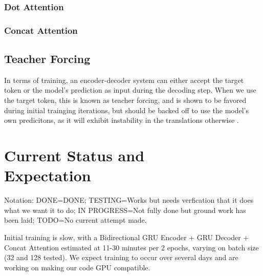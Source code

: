 \documentclass[twoside,twocolumn]{article}
\begin{document}
\subsubsection{Dot Attention}
\subsubsection{Concat Attention}

\subsection{Teacher Forcing}
In terms of training, an encoder-decoder system can either accept the target
token or the model's prediction as input during the decoding step. When we use
the target token, this is known as teacher forcing, and is shown to be favored
during initial trainging iterations, but should be backed off to use the
model's own predicitons, as it will exhibit instability in the translations
otherwise \cite{lamb2016professor}.


\section{Current Status and\\Expectation}
Notation: DONE=DONE; TESTING=Works but needs verfication that it does what we
want it to do; IN PROGRESS=Not fully done but ground work has been laid;
TODO=No current attempt made.

Initial training is slow, with a Bidirectional GRU Encoder + GRU Decoder +
Concat Attention estimated at 11-30 minutes per 2 epochs, varying on batch size
(32 and 128 tested). We expect training to occur over several days and are
working on making our code GPU compatible.
\end{document}
